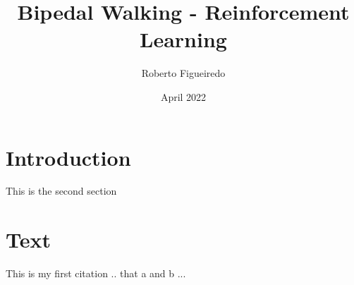 \documentclass[12pt, letterpaper]{article}
\title{Bipedal Walking - Reinforcement Learning}
\author{Roberto Figueiredo}
\date{April 2022}
\begin{document}
\begin{titlepage}
    \maketitle 
\end{titlepage}

\tableofcontents

\pagebreak
    
\section{Introduction}

This is the second section
     
\section{Text}
This is my first citation \cite{femto_anup}.. that a and b ...




\end{document}
